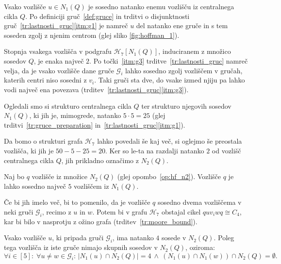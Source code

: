 \documentclass[fin1, tisk]{fmfdelo}
\newcommand{\gr}{\mathscr{G}}
\newcommand{\hof}{\mathscr{H}_{7}}
\begin{document}
\begin{posledica}\label{po:enolicna_povezava_iz_nq_v_q}
    Vsako vozlišče $u\in N_1(Q)$ je sosedno natanko enemu vozlišču iz centralnega
    cikla $Q$. Po definiciji gruč~\ref{def:gruce} in trditvi o disjunktnosti gruč~\ref{tr:lastnosti_gruc}\ref{itm:g1}
    je namreč $u$ del natanko ene gruče
    in s tem soseden zgolj z njenim centrom (glej sliko \ref{fig:hoffman_1}).
\end{posledica}


\begin{posledica}\label{po:lastnosti_gruc}
Stopnja vsakega vozlišča v podgrafu $\hof[N_1(Q)]$, induciranem z
množico sosedov $Q$, je enaka največ $2$. 
Po točki~\ref{itm:g3} trditve~\ref{tr:lastnosti_gruc} namreč velja, da je vsako vozlišče dane 
gruče $\gr_i$ lahko sosedno zgolj vozliščem v gručah, katerih centri niso sosedni z $v_i$.
Taki gruči sta dve, do vsake izmed njiju pa lahko vodi največ ena povezava (trditev~\ref{tr:lastnosti_gruc}\ref{itm:g3}).
\end{posledica}

\begin{opomba}\label{op:hf_n2}
Ogledali smo si strukturo centralnega cikla $Q$ ter strukturo njegovih sosedov $N_1(Q)$,
ki jih je, mimogrede, natanko $5\cdot 5 = 25$ 
(glej trditvi~\ref{tr:gruce_preparation} in~\ref{tr:lastnosti_gruc}\ref{itm:g1}).

Da bomo o strukturi grafa $\hof$ lahko povedali še kaj več, si oglejmo še preostala vozlišča, 
ki jih je $50 - 5 - 25 = 20$. Ker so le-ta na razdalji natanko $2$ od vozlišč centralnega cikla $Q$,
jih prikladno označimo z $N_2(Q)$.
\end{opomba}

\begin{trditev}\label{tr:st_povezav_iz_n2q}
    Naj bo $q$ vozlišče iz množice $N_2(Q)$ (glej opombo~\ref{op:hf_n2}).
    Vozlišče $q$ je lahko sosedno
    največ $5$ vozliščem iz $N_1(Q)$.
\end{trditev}
\begin{dokaz}
    Če bi jih imelo več, bi to pomenilo, da je vozlišče $q$ sosedno dvema vozliščema v neki gruči $\gr_i$,
    recimo z $u$ in $w$. Potem bi v grafu $\hof$ obstajal cikel $q u v_i w q \cong C_4$,
    kar bi bilo v nasprotju z ožino grafa (trditev~\ref{tr:moore_bound}).
\end{dokaz}

\begin{trditev}\label{tr:st_sosedov_v_n2q}
Vsako vozlišče $u$, ki pripada gruči $\gr_i$, ima natanko $4$ sosede v $N_2(Q)$. Poleg tega
vozlišča iz iste gruče nimajo skupnih sosedov v $N_2(Q)$, oziroma:
\[
\forall i \in [5]:\; \forall u\neq w \in \gr_i:\, |N_1(u) \cap N_2(Q)| = 4 \ \land \ (N_1(u) \cap N_1(w)) \cap N_2(Q) = \emptyset.
\]
\end{trditev}
\end{document}
